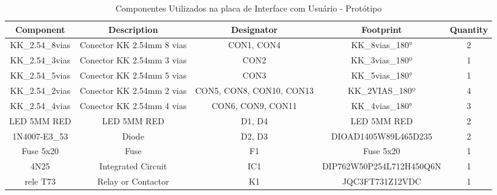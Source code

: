 \documentclass[../delivery_hospital_report.tex]{subfiles}
\begin{document}
\begin{table}[]
\caption{Componentes Utilizados na placa de Interface com Usuário - Protótipo}
\centering
\begin{adjustbox}{width=\columnwidth,center}
\begin{tabular}{|c|c|c|c|c|}
\hline
Component                   & Description                                    & Designator                             & Footprint                   & Quantity \\ \hline
KK\_2.54\_8vias             & Conector KK 2.54mm 8   vias                    & CON1, CON4                             & KK\_8vias\_180°             & 2        \\ \hline
KK\_2.54\_3vias             & Conector KK 2.54mm 3   vias                    & CON2                                   & KK\_3vias\_180º             & 1        \\ \hline
KK\_2.54\_5vias             & Conector KK 2.54mm 5   vias                    & CON3                                   & KK\_5vias\_180°             & 1        \\ \hline
KK\_2.54\_2vias             & Conector KK 2.54mm 2   vias                    & CON5, CON8, CON10,   CON13             & KK\_2VIAS\_180º             & 4        \\ \hline
KK\_2.54\_4vias             & Conector KK 2.54mm 4   vias                    & CON6, CON9, CON11                      & KK\_4vias\_180°             & 3        \\ \hline
LED 5MM RED                 & LED 5MM RED                                    & D1, D4                                 & LED 5MM RED                 & 2        \\ \hline
1N4007-E3\_53               & Diode                                          & D2, D3                                 & DIOAD1405W89L465D235        & 2        \\ \hline
Fuse 5x20                   & Fuse                                           & F1                                     & Fuse 5x20                   & 1        \\ \hline
4N25                        & Integrated Circuit                             & IC1                                    & DIP762W50P254L712H450Q6N    & 1        \\ \hline
rele T73                    & Relay or Contactor                             & K1                                     & JQC3FT731Z12VDC             & 1        \\ \hline

\end{tabular}
\end{adjustbox}
\end{table}
\end{document}
